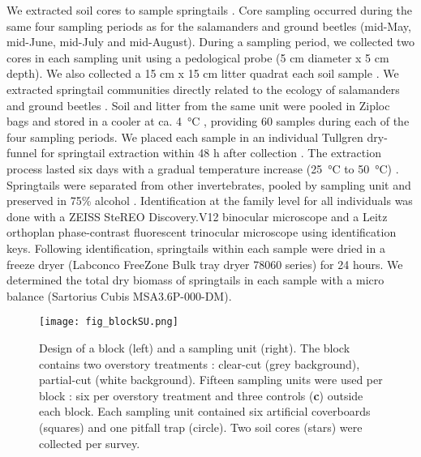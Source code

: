 We extracted soil cores to sample springtails \citep{pongeVerticalDistributionCollembola2000,salamonEffectsPlantDiversity2004,chauvatChangesSoilFaunal2011a,farskaManagementIntensityAffects2014}. 
Core sampling occurred during the same four sampling periods as for the salamanders and ground beetles (mid-May, mid-June, mid-July and mid-August). 
During a sampling period, we collected two cores in each sampling unit using a pedological probe (5 cm diameter x 5 cm depth). 
We also collected a 15 cm x 15 cm litter quadrat each soil sample \citep{raymond-leonardSpringtailCommunityStructure2018a,rousseauForestFloorMesofauna2018}.
We extracted springtail communities directly related to the ecology of salamanders and ground beetles \citep{edwardsAssessmentPopulationsSoilinhabiting1991,chauvatChangesSoilFaunal2011a,raymond-leonardSpringtailCommunityStructure2018a,rousseauForestFloorMesofauna2018}.
Soil and litter from the same unit were pooled in Ziploc\up{\texttrademark{}} bags and stored in a cooler at ca. 4 °C \citep{chauvatChangesSoilFaunal2011a,rousseauForestFloorMesofauna2018}, providing 60 samples during each of the four sampling periods.
We placed each sample in an individual Tullgren dry-funnel for springtail extraction within 48 h after collection \citep{rusekBiodiversityCollembolaTheir1998,wuCompositionSpatiotemporalVariation2014,rousseauForestFloorMesofauna2018}. 
The extraction process lasted six days with a gradual temperature increase (25 °C to 50 °C) \citep{raymond-leonardSpringtailCommunityStructure2018a}.
Springtails were separated from other invertebrates, pooled by sampling unit and preserved in 75\% alcohol \citep{wuCompositionSpatiotemporalVariation2014}.
Identification at the family level for all individuals was done with a ZEISS SteREO Discovery.V12 binocular microscope and a Leitz orthoplan phase-contrast fluorescent trinocular microscope using \cite{bellingerChecklistCollembolaWorld1996} identification keys. 
Following identification, springtails within each sample were dried in a freeze dryer (Labconco FreeZone Bulk tray dryer 78060 series) for 24 hours. 
We determined the total dry biomass of springtails in each sample with a micro balance (Sartorius Cubis\up{\texttrademark{}} MSA3.6P-000-DM).

\pagebreak

\begin{figure}[ht]
	\centering
	\texttt{[image: fig\_blockSU.png]}
	\caption[Design of one block and one sampling unit with three sampling methods.]{
  Design of a block (left) and a sampling unit (right). 
  The block contains two overstory treatments : clear-cut (grey background), partial-cut (white background). 
  Fifteen sampling units were used per block : six per overstory treatment and three controls (\textbf{c}) outside each block.
  Each sampling unit contained six artificial coverboards (squares) and one pitfall trap (circle). Two soil cores (stars) were collected per survey.
  }
	\label{fig:blockSU}
	\end{figure}  

